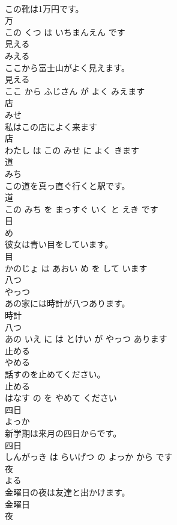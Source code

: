 \documentclass[8pt]{extreport}
\begin{document}
\begin{CJK}{UTF8}{min}
\\	この靴は1万円です。	
\\	万 
\\	この くつ は いちまんえん です			
\\	見える	
\\	みえる			
\\	ここから富士山がよく見えます。	
\\	見える 
\\	ここ から ふじさん が よく みえます			
\\	店	
\\	みせ			
\\	私はこの店によく来ます	
\\	店 
\\	わたし は この みせ に よく きます			
\\	道	
\\	みち			
\\	この道を真っ直ぐ行くと駅です。	
\\	道 
\\	この みち を まっすぐ いく と えき です			
\\	目	
\\	め			
\\	彼女は青い目をしています。	
\\	目 
\\	かのじょ は あおい め を して います			
\\	八つ	
\\	やっつ			
\\	あの家には時計が八つあります。	
\\	時計 
\\	八つ 
\\	あの いえ に は とけい が やっつ あります			
\\	止める	
\\	やめる			
\\	話すのを止めてください。	
\\	止める 
\\	はなす の を やめて ください			
\\	四日	
\\	よっか			
\\	新学期は来月の四日からです。	
\\	四日 
\\	しんがっき は らいげつ の よっか から です			
\\	夜	
\\	よる			
\\	金曜日の夜は友達と出かけます。	
\\	金曜日 
\\	夜 

\end{CJK}
\end{document}
